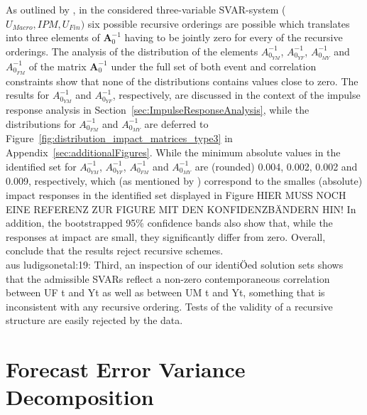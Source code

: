 \documentclass[a4paper,11pt,listof=nochaptergap,oneside,pointednumbers,bibtotoc,bigheadings,liststotoc,hidelinks]{scrbook}
\theoremstyle{mysatz}
\theoremstyle{mydefinition}
\theoremstyle{mytheorem}
\theoremstyle{mybemerkung}
\newcommand{\vect}[1]{\boldsymbol{\mathbf{#1}}}
\begin{document}
As outlined by \citet{ludvigsonetal:19}, in the considered three-variable SVAR-system ($U_{Macro}, IPM, U_{Fin})$ six possible recursive orderings are possible which translates into three elements of $\vect{A}_0^{-1}$ having to be jointly zero for every of the recursive orderings. The analysis of the distribution of the elements $A_{0_{YM}}^{-1}$, $A_{0_{YF}}^{-1}$, $A_{0_{MY}}^{-1}$ and $A_{0_{FM}}^{-1}$ of the matrix $\vect{A}_0^{-1}$ under the full set of both event and correlation constraints show that none of the distributions contains values close to zero. The results for $A_{0_{YM}}^{-1}$ and $A_{0_{YF}}^{-1}$, respectively, are discussed in the context of the impulse response analysis in Section~\ref{sec:ImpulseResponseAnalysis}, while the distributions for $A_{0_{FM}}^{-1}$ and $A_{0_{MY}}^{-1}$ are deferred to Figure~\ref{fig:distribution_impact_matrices_type3} in Appendix~\ref{sec:additionalFigures}. While the minimum absolute values in the identified set for $A_{0_{YM}}^{-1}$, $A_{0_{YF}}^{-1}$, $A_{0_{FM}}^{-1}$ and $A_{0_{MY}}^{-1}$ are (rounded) 0.004, 0.002, 0.002 and 0.009, respectively, which (as mentioned by \citealp{ludvigsonetal:19}) correspond to the smalles (absolute) impact responses in the identified set displayed in Figure HIER MUSS NOCH EINE REFERENZ ZUR FIGURE MIT DEN KONFIDENZBÄNDERN HIN! In addition, the bootstrapped 95\% confidence bands also show that, while the responses at impact are small, they significantly differ from zero. Overall, \citet{ludvigsonetal:19} conclude that the results reject recursive schemes.
\\
aus ludigsonetal:19: Third, an inspection of our identiÖed solution sets shows that the admissible SVARs reflect a non-zero contemporaneous correlation between UF t and Yt as well as between UM t and Yt, something that is inconsistent with any recursive ordering. Tests of the validity of a recursive structure are easily rejected by the data.

\section[Forecast Error Variance Decomposition]{Forecast Error Variance Decomposition}
\label{sec:FEVD}
\end{document}
